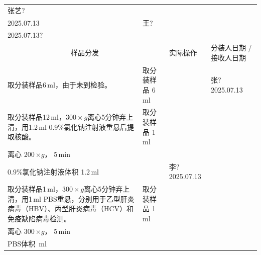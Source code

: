 \documentclass[UTF8,10pt,a4paper,fontset=fandol]{ctexart}
\newcommand{\fieldvalue}[1]{#1}
\newcommand{\handwritten}[1]{#1}
\begin{document}
\begin{tabularx}{\textwidth}{|p{}|X|p{}|p{}|}
\fieldvalue{\handwritten{张艺?}}\\
\fieldvalue{\handwritten{2025.07.13}} &
\fieldvalue{\handwritten{王?}}\\
\fieldvalue{\handwritten{2025.07.13?}} \\
\hline
\multicolumn{2}{|c|}{样品分发} & 实际操作 & 分装人日期 / 接收人日期 \\
\hline
取分装样品6\,ml，由于未到检验。 &
取分装样品
\fieldvalue{\handwritten{6}}\,ml &
\multicolumn{1}{l|}{} &
\fieldvalue{\handwritten{张?\,2025.07.13}} \\
\hline
取分装样品12\,ml，$300\times g$离心5分钟弃上清，用1.2\,ml 0.9\%氯化钠注射液重悬后提取核酸。 &
取分装样品
\fieldvalue{\handwritten{1}}\,ml\\
离心
\fieldvalue{\handwritten{200}}\,$\times g$，
\fieldvalue{\handwritten{5}}\,min\\
0.9\%氯化钠注射液体积
\fieldvalue{\handwritten{1.2}}\,ml &
\multicolumn{1}{l|}{} &
\fieldvalue{\handwritten{李?\,2025.07.13}} \\
\hline
取分装样品1\,ml，$300\times g$离心5分钟弃上清，用1\,ml PBS重悬，分别用于乙型肝炎病毒（HBV）、丙型肝炎病毒（HCV）和免疫缺陷病毒检测。 &
取分装样品
\fieldvalue{\handwritten{1}}\,ml\\
离心
\fieldvalue{\handwritten{300}}\,$\times g$，
\fieldvalue{\handwritten{5}}\,min\\
PBS体积
\underline{\hspace{1.2cm}}\,ml &

\end{tabularx}
\end{document}
